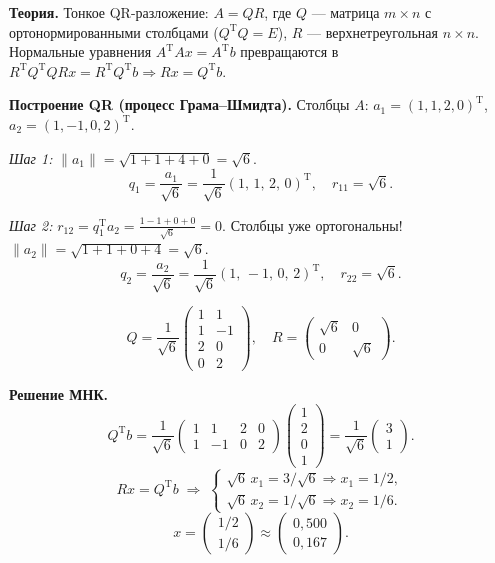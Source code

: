 \documentclass{article}
\begin{document}
\textbf{Теория.} Тонкое QR-разложение: $A = QR$, где $Q$ --- матрица $m\times n$ с ортонормированными столбцами ($Q^\text{T}Q = E$), $R$ --- верхнетреугольная $n\times n$. Нормальные уравнения $A^\text{T}Ax = A^\text{T}b$ превращаются в $R^\text{T}Q^\text{T}QRx = R^\text{T}Q^\text{T}b \Rightarrow Rx = Q^\text{T}b$.

\textbf{Построение QR (процесс Грама--Шмидта).} Столбцы $A$: $a_1 = (1,1,2,0)^\text{T}$, $a_2 = (1,-1,0,2)^\text{T}$.

\textit{Шаг 1:} $\|a_1\| = \sqrt{1+1+4+0} = \sqrt{6}$.
$$q_1 = \frac{a_1}{\sqrt{6}} = \frac{1}{\sqrt{6}}(1,\,1,\,2,\,0)^\text{T}, \quad r_{11} = \sqrt{6}.$$

\textit{Шаг 2:} $r_{12} = q_1^\text{T}a_2 = \frac{1-1+0+0}{\sqrt{6}} = 0$. Столбцы уже ортогональны!
$\|a_2\| = \sqrt{1+1+0+4} = \sqrt{6}$.
$$q_2 = \frac{a_2}{\sqrt{6}} = \frac{1}{\sqrt{6}}(1,\,-1,\,0,\,2)^\text{T}, \quad r_{22} = \sqrt{6}.$$

$$Q = \frac{1}{\sqrt{6}}\begin{pmatrix} 1 & 1 \\ 1 & -1 \\ 2 & 0 \\ 0 & 2 \end{pmatrix}, \quad R = \begin{pmatrix} \sqrt{6} & 0 \\ 0 & \sqrt{6} \end{pmatrix}.$$

\textbf{Решение МНК.}
$$Q^\text{T}b = \frac{1}{\sqrt{6}}\begin{pmatrix} 1 & 1 & 2 & 0 \\ 1 & -1 & 0 & 2 \end{pmatrix}\begin{pmatrix} 1 \\ 2 \\ 0 \\ 1 \end{pmatrix} = \frac{1}{\sqrt{6}}\begin{pmatrix} 3 \\ 1 \end{pmatrix}.$$
$$Rx = Q^\text{T}b \;\Rightarrow\; \begin{cases} \sqrt{6}\,x_1 = 3/\sqrt{6} \Rightarrow x_1 = 1/2, \\ \sqrt{6}\,x_2 = 1/\sqrt{6} \Rightarrow x_2 = 1/6. \end{cases}$$
$$\boxed{x = \begin{pmatrix} 1/2 \\ 1/6 \end{pmatrix} \approx \begin{pmatrix} 0,500 \\ 0,167 \end{pmatrix}.}$$
\end{document}
